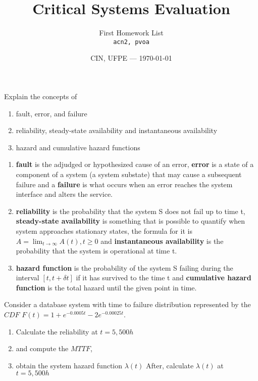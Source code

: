 \documentclass{article}
\title{Critical Systems Evaluation} %
\author{First Homework List\\ \texttt{acn2, pvoa}} %
\date{CIN, UFPE --- \today} %
\begin{document}
\maketitle %

\begin{question}
    Explain the concepts of 
    \begin{enumerate}[{(a)}]
        \item fault, error, and failure
        \item reliability, steady-state availability and instantaneous availability
        \item  hazard and cumulative hazard functions
    \end{enumerate}
    \end{question}
\setcounter{Question}{1}

\begin{enumerate}[{(a)}]
    \item \textbf{fault} is the adjudged or hypothesized cause of an error, \textbf{error} is a state of a component of a system (a system substate) that may cause a subsequent failure and a \textbf{failure} is what occurs when an error reaches the system interface and alters the service.
    \item \textbf{reliability} is the probability that the system S does not fail up to time t, \textbf{steady-state availability} is something that is possible to quantify when system approaches stationary states, the formula for it is $A=\lim_{t \to \infty} A(t), t\ge0$ and \textbf{instantaneous availability} is the probability that the system is operational at time t.
    \item \textbf{hazard function} is the probability of the system S failing during the interval $[t,t+\delta t]$ if it has survived to the time t and \textbf{cumulative hazard function} is the total hazard until the given point in time.
\end{enumerate}
    
\begin{question}
Consider a database system with time to failure distribution represented
by the $CDF$ $F(t)=1+e^{-0.0005t}-2e^{-0.00025t}$.  
    \begin{enumerate}[{(a)}]
        \item Calculate the reliability at $t=5,500h$ 
        \item and compute the $MTTF$,
        \item obtain the system hazard function $\lambda(t)$  After, calculate $\lambda(t)$ at $t=5,500h$
    \end{enumerate}
\end{question}
\end{document}

